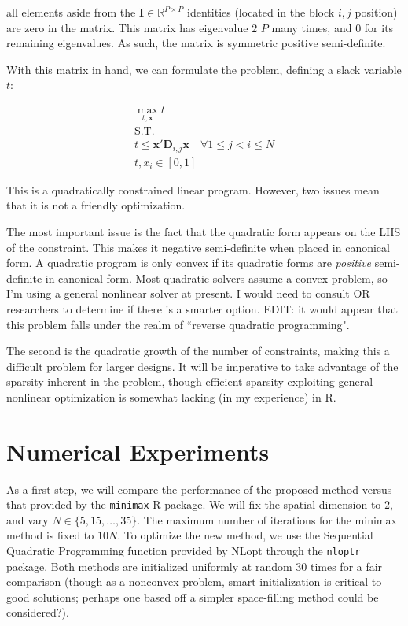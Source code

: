 \documentclass[]{article}
\begin{document}
all elements aside from the $\mathbf{I} \in \mathbb{R}^{P\times P}$ identities (located in the block $i,j$ position) are zero in the matrix. This matrix has eigenvalue $2$ $P$ many times, and $0$ for its remaining eigenvalues. As such, the matrix is symmetric positive semi-definite.

With this matrix in hand, we can formulate the problem, defining a slack variable $t$:

\begin{align*}
	\max_{t, \mathbf{x}} t\\
	\textrm{S.T.}\\
	t \leq \mathbf{x}'\mathbf{D}_{i,j}\mathbf{x} \hspace{1em} \forall 1 \leq j < i \leq N\\
	t,x_i \in [0,1]
\end{align*}

This is a quadratically constrained linear program. However, two issues mean that it is not a friendly optimization. 

The most important issue is the fact that the quadratic form appears on the LHS of the constraint. This makes it negative semi-definite when placed in canonical form. A quadratic program is only convex if its quadratic forms are \textit{positive} semi-definite in canonical form. Most quadratic solvers assume a convex problem, so I'm using a general nonlinear solver at present. I would need to consult OR researchers to determine if there is a smarter option. EDIT: it would appear that this problem falls under the realm of ``reverse quadratic programming".

The second is the quadratic growth of the number of constraints, making this a difficult problem for larger designs. It will be imperative to take advantage of the sparsity inherent in the problem, though efficient sparsity-exploiting general nonlinear optimization is somewhat lacking (in my experience) in R.

\section{Numerical Experiments}

As a first step, we will compare the performance of the proposed method versus that provided by the \texttt{minimax} R package. We will fix the spatial dimension to $2$, and vary $N \in \{5, 15, \ldots, 35\}$. The maximum number of iterations for the minimax method is fixed to $10N$. To optimize the new method, we use the Sequential Quadratic Programming function provided by NLopt through the \texttt{nloptr} package. Both methods are initialized uniformly at random 30 times  for a fair comparison (though as a nonconvex problem, smart initialization is critical to good solutions; perhaps one based off a simpler space-filling method could be considered?).
\end{document}
